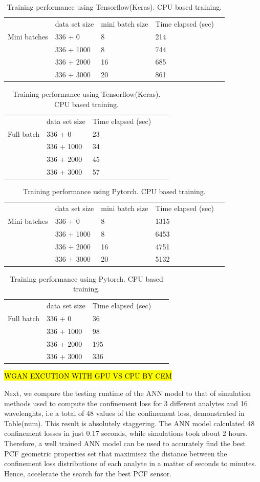 \documentclass[draft, a4, 10pt, onecolumn]{IEEEtran}
\begin{document}
\begin{table}[h]
\begin{tabular}{lllll}
    & data set size & mini batch size & Time elapsed (sec) \\
Mini batches    &336 + 0 & 8 & 214 & \\
    &336 + 1000 & 8 & 744 & \\
    &336 + 2000 & 16 & 685  & \\ 
    &336 + 3000 & 20 & 861  & \\
\end{tabular}
\begin{tabular}{lllll}
   & data set size & Time elapsed (sec) \\
Full batch    &336 + 0 &  23 & \\
    &336 + 1000 &  34 & \\
    &336 + 2000 &  45 & \\ 
    &336 + 3000 &  57 & \\
\end{tabular}
\caption{Training performance using Tensorflow(Keras). CPU based training.}
\end{table}
\begin{table}[h]
\begin{tabular}{lllll}
 & data set size & mini batch size & Time elapsed (sec) \\
Mini batches    & 336 + 0 & 8 & 1315 & \\
    & 336 + 1000 & 8 & 6453  & \\
    & 336 + 2000 & 16 & 4751  & \\ 
    & 336 + 3000 & 20 & 5132 & \\
\end{tabular}
\begin{tabular}{lllll}
   &data set size & Time elapsed (sec) \\
   Full batch &336 + 0 &  36  & \\
    & 336 + 1000 &  98  & \\
    & 336 + 2000 &  195  & \\ 
    & 336 + 3000 &  336  & \\
\end{tabular}
\caption{Training performance using Pytorch. CPU based training.}
\end{table}

\hl{WGAN EXCUTION WITH GPU VS CPU BY CEM}

Next, we compare the testing runtime of the ANN model to that of simulation methods used to compute the confinement loss for 3 different analytes and 16 wavelenghts, i.e a total of 48 values of the confinement loss, demonstrated in Table(num). This result is absolutely staggering. The ANN model calculated 48 confinement losses in just 0.17 seconds, while simulations took about 2 hours. Therefore, a well trained ANN model can be used to accurately find the best PCF geometric properties set that maximisez the distance between the confinement loss distributions of each analyte in a matter of seconds to minutes. Hence, accelerate the search for the best PCF sensor.
\end{document}
